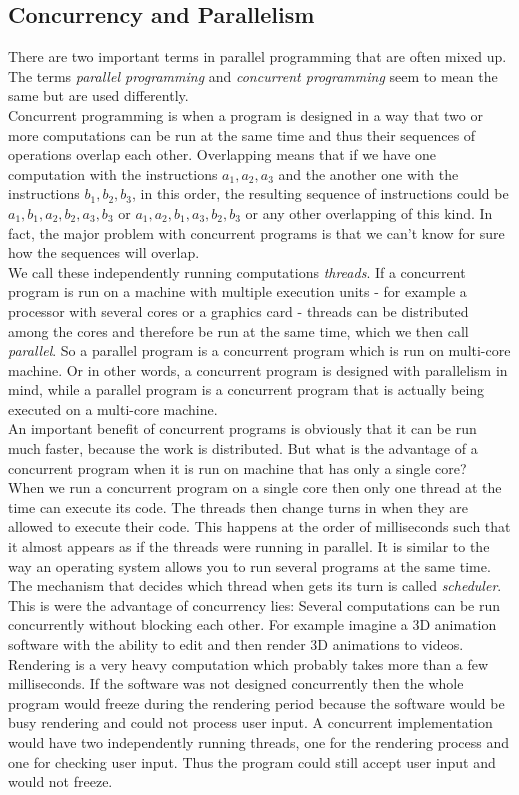 \documentclass{scrreprt}
\begin{document}
\subsection{Concurrency and Parallelism}
There are two important terms in parallel programming that are often mixed up. The terms \textit{parallel programming} and \textit{concurrent programming} seem to mean the same but are used differently. \\
Concurrent programming is when a program is designed in a way that two or more computations can be run at the same time and thus their sequences of operations overlap each other. Overlapping means that if we have one computation with the instructions $a_1, a_2, a_3$ and the another one with the instructions $b_1, b_2, b_3$, in this order, the resulting sequence of instructions could be $a_1, b_1, a_2, b_2, a_3, b_3$ or $a_1, a_2, b_1, a_3, b_2, b_3$ or any other overlapping of this kind. In fact, the major problem with concurrent programs is that we can't know for sure how the sequences will overlap. \\
We call these independently running computations \textit{threads}. If a concurrent program is run on a machine with multiple execution units - for example a processor with several cores or a graphics card - threads can be distributed among the cores and therefore be run at the same time, which we then call \textit{parallel}.
So a parallel program is a concurrent program which is run on multi-core machine. Or in other words, a concurrent program is designed with parallelism in mind, while a parallel program is a concurrent program that is actually being executed on a multi-core machine. \\
An important benefit of concurrent programs is obviously that it can be run much faster, because the work is distributed. But what is the advantage of a concurrent program when it is run on machine that has only a single core? \\
When we run a concurrent program on a single core then only one thread at the time can execute its code. The threads then change turns in when they are allowed to execute their code. This happens at the order of milliseconds such that it almost appears as if the threads were running in parallel. It is similar to the way an operating system allows you to run several programs at the same time. The mechanism that decides which thread when gets its turn is called \textit{scheduler}. \\
This is were the advantage of concurrency lies: Several computations can be run concurrently without blocking each other. For example imagine a 3D animation software with the ability to edit and then render 3D animations to videos. Rendering is a very heavy computation which probably takes more than a few milliseconds. If the software was not designed concurrently then the whole program would freeze during the rendering period because the software would be busy rendering and could not process user input. A concurrent implementation would have two independently running threads, one for the rendering process and one for checking user input. Thus the program could still accept user input and would not freeze.
\end{document}
